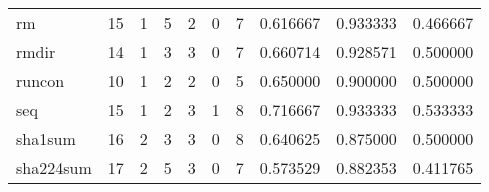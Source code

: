 \begin{tabular}{lrrrrrrrrr}
rm        &                                      15 &                                                  1 &                                                  5 &                                                  2 &                                                  0 &                                                  7 &                                           0.616667 &                               0.933333 &                             0.466667 \\
rmdir     &                                      14 &                                                  1 &                                                  3 &                                                  3 &                                                  0 &                                                  7 &                                           0.660714 &                               0.928571 &                             0.500000 \\
runcon    &                                      10 &                                                  1 &                                                  2 &                                                  2 &                                                  0 &                                                  5 &                                           0.650000 &                               0.900000 &                             0.500000 \\
seq       &                                      15 &                                                  1 &                                                  2 &                                                  3 &                                                  1 &                                                  8 &                                           0.716667 &                               0.933333 &                             0.533333 \\
sha1sum   &                                      16 &                                                  2 &                                                  3 &                                                  3 &                                                  0 &                                                  8 &                                           0.640625 &                               0.875000 &                             0.500000 \\
sha224sum &                                      17 &                                                  2 &                                                  5 &                                                  3 &                                                  0 &                                                  7 &                                           0.573529 &                               0.882353 &                             0.411765 \\

\end{tabular}

